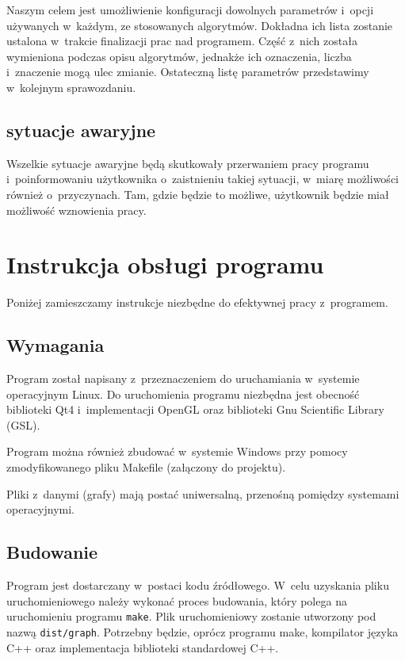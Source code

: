 \documentclass[a4paper,onecolumn,oneside,12pt]{mwart}
\begin{document}
Naszym celem jest umożliwienie konfiguracji dowolnych parametrów i~opcji
używanych w~każdym, ze stosowanych algorytmów. Dokładna ich lista zostanie
ustalona w~trakcie finalizacji prac nad programem. Część z~nich została
wymieniona podczas opisu algorytmów, jednakże ich oznaczenia, liczba
i~znaczenie mogą ulec zmianie. Ostateczną listę parametrów przedstawimy
w~kolejnym sprawozdaniu.

\subsection{sytuacje awaryjne}

Wszelkie sytuacje awaryjne będą skutkowały przerwaniem pracy programu
i~poinformowaniu użytkownika o~zaistnieniu takiej sytuacji, w~miarę
możliwości również o~przyczynach. Tam, gdzie będzie to możliwe, użytkownik
będzie miał możliwość wznowienia pracy.

\section{Instrukcja obsługi programu}

Poniżej zamieszczamy instrukcje niezbędne do efektywnej pracy z~programem.

\subsection{Wymagania}

Program został napisany z~przeznaczeniem do uruchamiania w~systemie
operacyjnym Linux. Do uruchomienia programu niezbędna jest obecność
biblioteki Qt4 i~implementacji OpenGL oraz biblioteki Gnu Scientific
Library (GSL).

Program można również zbudować w~systemie Windows przy pomocy
zmodyfikowanego pliku Makefile (załączony do projektu).

Pliki z~danymi (grafy) mają postać uniwersalną, przenośną pomiędzy
systemami operacyjnymi.

\subsection{Budowanie}

Program jest dostarczany w~postaci kodu źródłowego. W~celu uzyskania
pliku uruchomieniowego należy wykonać proces budowania, który polega na
uruchomieniu programu \texttt{make}. Plik uruchomieniowy zostanie utworzony
pod nazwą \texttt{dist/graph}. Potrzebny będzie, oprócz programu make,
kompilator języka C++ oraz implementacja biblioteki standardowej C++.
\end{document}
